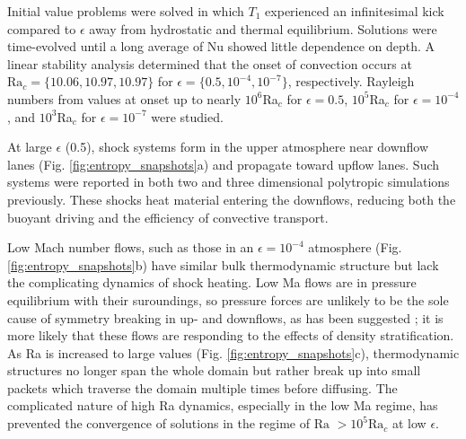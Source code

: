 \documentclass[aps, prl, twocolumn, nofootinbib, groupedaddress, amsfonts, amssymb, amsmath]{revtex4-1}
\begin{document}
Initial value problems were solved in which $T_1$ experienced an infinitesimal kick compared to $\epsilon$
away from hydrostatic and thermal equilibrium.
Solutions were time-evolved until a long average of Nu showed little
dependence on depth. A linear stability analysis determined that the onset of convection
occurs at $\text{Ra}_c = \{10.06, 10.97, 10.97\}$ for $\epsilon = \{0.5, 10^{-4}, 10^{-7}\}$, respectively.  Rayleigh
numbers from values at onset up to nearly $10^6$Ra$_c$ for $\epsilon = 0.5$, $10^5$Ra$_c$ for $\epsilon = 10^{-4}$,
and $10^3$Ra$_c$ for $\epsilon = 10^{-7}$ were studied.  

At large $\epsilon$ (0.5), shock systems form in the upper atmosphere near downflow lanes 
(Fig. \ref{fig:entropy_snapshots}a) and propagate toward upflow lanes.  
Such systems were reported in
both two \cite{cattaneo&all1990} and three \cite{malagoli&all1990} dimensional polytropic simulations previously.
These shocks heat material entering the downflows, reducing both the
buoyant driving and the efficiency of convective transport.

Low Mach number flows, such as those in an $\epsilon = 10^{-4}$ atmosphere (Fig. \ref{fig:entropy_snapshots}b)
have similar bulk thermodynamic structure but lack the complicating dynamics of shock heating. 
Low Ma flows are in pressure equilibrium with their suroundings, so
pressure forces are unlikely to be the sole cause of symmetry breaking in up- and downflows, as has been suggested
\cite{hurlburt&all1984};  it is more likely that these flows are responding to 
the effects of density stratification.
As Ra is increased to large values (Fig. \ref{fig:entropy_snapshots}c), thermodynamic structures 
no longer span the whole domain but rather break up into small packets which traverse the domain multiple
times before diffusing.  
The complicated nature of high Ra dynamics, especially in the low Ma regime,
has prevented the convergence of solutions in the regime of 
$\text{Ra }> 10^5\text{Ra}_c$ at low $\epsilon$.
\end{document}
